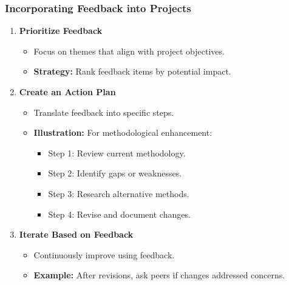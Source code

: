 \documentclass{beamer}
\begin{document}
\begin{frame}[fragile]
    \frametitle{Incorporating Feedback into Projects}
    \begin{enumerate}
        \item \textbf{Prioritize Feedback}
            \begin{itemize}
                \item Focus on themes that align with project objectives.
                \item \textbf{Strategy:} Rank feedback items by potential impact.
            \end{itemize}
        
        \item \textbf{Create an Action Plan}
            \begin{itemize}
                \item Translate feedback into specific steps.
                \item \textbf{Illustration:} For methodological enhancement:
                    \begin{itemize}
                        \item Step 1: Review current methodology.
                        \item Step 2: Identify gaps or weaknesses.
                        \item Step 3: Research alternative methods.
                        \item Step 4: Revise and document changes.
                    \end{itemize}
            \end{itemize}
        
        \item \textbf{Iterate Based on Feedback}
            \begin{itemize}
                \item Continuously improve using feedback.
                \item \textbf{Example:} After revisions, ask peers if changes addressed concerns.
            \end{itemize}
    \end{enumerate}
\end{frame}
\end{document}
